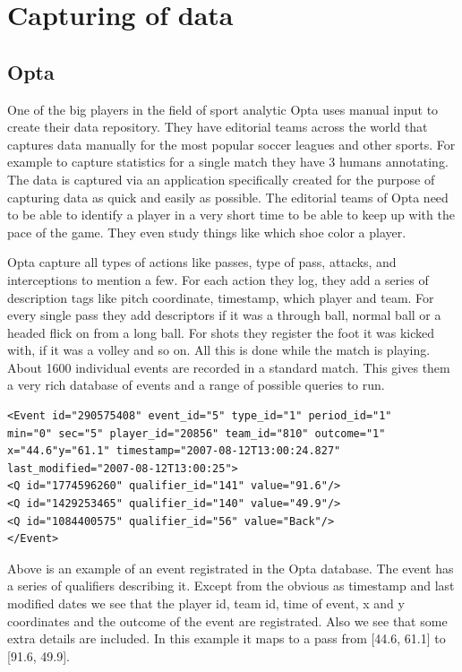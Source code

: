 \section{Capturing of data}
\subsection{Opta}

One of the big players in the field of sport analytic Opta uses manual input to create their data repository. They have editorial teams across the world that captures data manually for the most popular soccer leagues and other sports. For example to capture statistics for a single match they have 3 humans annotating. The data is captured via an application specifically created for the purpose of capturing data as quick and easily as possible. The editorial teams of Opta need to be able to identify a player in a very short time to be able to keep up with the pace of the game. They even study things like which shoe color a player.

Opta capture all types of actions like passes, type of pass, attacks, and interceptions to mention a few. For each action they log, they add a series of description tags like pitch coordinate, timestamp, which player and team. For every single pass they add descriptors if it was a through ball, normal ball or a headed flick on from a long ball. For shots they register the foot it was kicked with, if it was a volley and so on. All this is done while the match is playing. About 1600 individual events are recorded in a standard match.  This gives them a very rich database of events and a range of possible queries to run. 

\begin{lstlisting}
<Event id="290575408" event_id="5" type_id="1" period_id="1" 
min="0" sec="5" player_id="20856" team_id="810" outcome="1" 
x="44.6"y="61.1" timestamp="2007-08-12T13:00:24.827" 
last_modified="2007-08-12T13:00:25">
<Q id="1774596260" qualifier_id="141" value="91.6"/>
<Q id="1429253465" qualifier_id="140" value="49.9"/>
<Q id="1084400575" qualifier_id="56" value="Back"/>
</Event>
\end{lstlisting}

Above is an example of an event registrated in the Opta database. The event has a series of qualifiers describing it. Except from the obvious as timestamp and last modified dates we see that the player id, team id, time of event, x and y coordinates and the outcome of the event are registrated. Also we see that some extra details are included. In this example it maps to a pass from [44.6, 61.1] to [91.6, 49.9]. 

